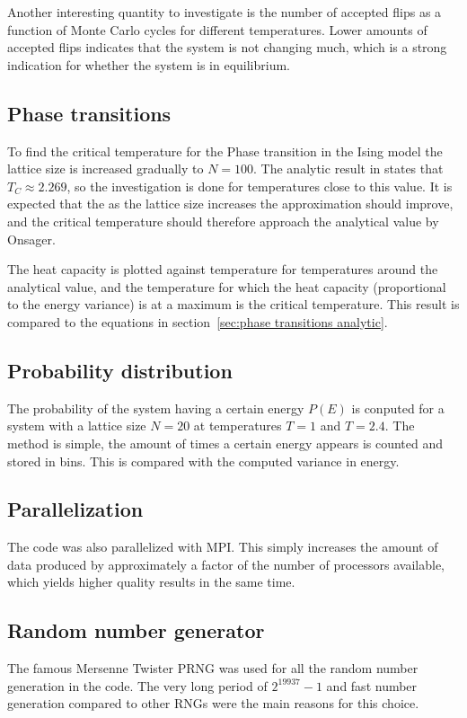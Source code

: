 \documentclass[aps,reprint]{revtex4-1}
\begin{document}
Another interesting quantity to investigate is the number of accepted flips as
a function of Monte Carlo cycles for different temperatures. Lower amounts of
accepted flips indicates that the system is not changing much, which is a strong
indication for whether the system is in equilibrium.
\subsection{Phase transitions} \label{sec:phase transitions}
To find the critical temperature for the Phase transition in the Ising model
the lattice size is increased gradually to $N = 100$. The analytic result in
\cite{onsager} states that $T_C \approx 2.269$, so the investigation is done
for temperatures close to this value. It is expected that the as the lattice size
increases the approximation should improve, and the critical temperature should
therefore approach the analytical value by Onsager.

The heat capacity is plotted against temperature for temperatures around the
analytical value, and the temperature for which the heat capacity (proportional
to the energy variance) is at a maximum is the critical temperature. This result
is compared to the equations in section~\ref{sec:phase transitions analytic}.

\subsection{Probability distribution}
The probability of the system having a certain energy $P(E)$ is conputed
for a system with a lattice size $N = 20$ at temperatures $T = 1$ and $T = 2.4$.
The method is simple, the amount of times a certain energy appears is counted
and stored in bins. This is compared with the computed variance in energy.

\subsection{Parallelization}
The code was also parallelized with MPI. This simply increases the amount of
data produced by approximately a factor of the number of processors available,
which yields higher quality results in the same time.

\subsection{Random number generator}
The famous Mersenne Twister PRNG was used for all the random number generation
in the code. The very long period of $2^{19937} - 1$ and fast number generation
compared to other RNGs were the main reasons for this choice.
\end{document}
